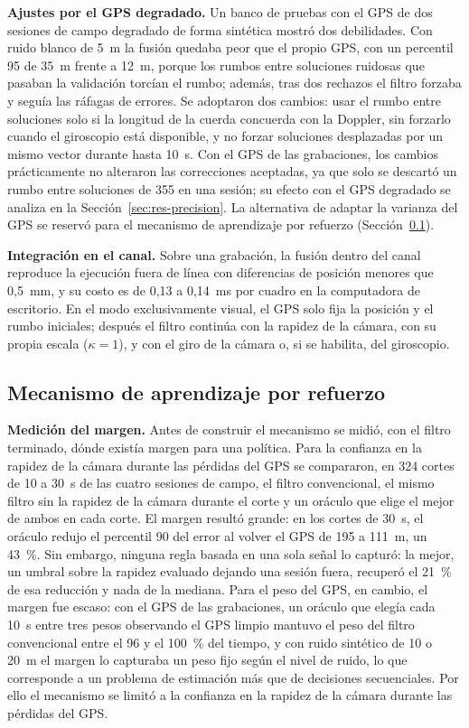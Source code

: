 \textbf{Ajustes por el GPS degradado.}
Un banco de pruebas con el GPS de dos sesiones de campo degradado de forma sintética mostró dos debilidades.
Con ruido blanco de 5~m la fusión quedaba peor que el propio GPS, con un percentil 95 de 35~m frente a 12~m, porque los rumbos entre soluciones ruidosas que pasaban la validación torcían el rumbo; además, tras dos rechazos el filtro forzaba y seguía las ráfagas de errores.
Se adoptaron dos cambios: usar el rumbo entre soluciones solo si la longitud de la cuerda concuerda con la Doppler, sin forzarlo cuando el giroscopio está disponible, y no forzar soluciones desplazadas por un mismo vector durante hasta 10~s.
Con el GPS de las grabaciones, los cambios prácticamente no alteraron las correcciones aceptadas, ya que solo se descartó un rumbo entre soluciones de 355 en una sesión; su efecto con el GPS degradado se analiza en la Sección~\ref{sec:res-precision}.
La alternativa de adaptar la varianza del GPS se reservó para el mecanismo de aprendizaje por refuerzo (Sección~\ref{sec:res-rl}).

\textbf{Integración en el canal.}
Sobre una grabación, la fusión dentro del canal reproduce la ejecución fuera de línea con diferencias de posición menores que 0,5~mm, y su costo es de 0,13 a 0,14~ms por cuadro en la computadora de escritorio.
En el modo exclusivamente visual, el GPS solo fija la posición y el rumbo iniciales; después el filtro continúa con la rapidez de la cámara, con su propia escala ($\kappa = 1$), y con el giro de la cámara o, si se habilita, del giroscopio.

\subsection{Mecanismo de aprendizaje por refuerzo}
\label{sec:res-rl}

\textbf{Medición del margen.}
Antes de construir el mecanismo se midió, con el filtro terminado, dónde existía margen para una política.
Para la confianza en la rapidez de la cámara durante las pérdidas del GPS se compararon, en 324 cortes de 10 a 30~s de las cuatro sesiones de campo, el filtro convencional, el mismo filtro sin la rapidez de la cámara durante el corte y un oráculo que elige el mejor de ambos en cada corte.
El margen resultó grande: en los cortes de 30~s, el oráculo redujo el percentil 90 del error al volver el GPS de 195 a 111~m, un 43~\%.
Sin embargo, ninguna regla basada en una sola señal lo capturó: la mejor, un umbral sobre la rapidez evaluado dejando una sesión fuera, recuperó el 21~\% de esa reducción y nada de la mediana.
Para el peso del GPS, en cambio, el margen fue escaso: con el GPS de las grabaciones, un oráculo que elegía cada 10~s entre tres pesos observando el GPS limpio mantuvo el peso del filtro convencional entre el 96 y el 100~\% del tiempo, y con ruido sintético de 10 o 20~m el margen lo capturaba un peso fijo según el nivel de ruido, lo que corresponde a un problema de estimación más que de decisiones secuenciales.
Por ello el mecanismo se limitó a la confianza en la rapidez de la cámara durante las pérdidas del GPS.

